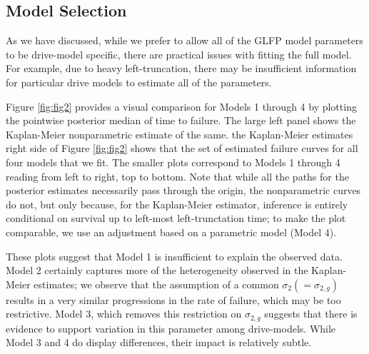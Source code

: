 \documentclass[12pt]{article}
\begin{document}



\subsection{Model Selection}
\label{sec:Model Comparisons}
As we have discussed, while we prefer to allow all of the GLFP model parameters to be drive-model specific, there are practical issues with fitting the full model. For example, due to heavy left-truncation, there may be insufficient information for particular drive models to estimate all of the parameters. 

Figure \ref{fig:fig2} provides a visual comparison for Models 1 through 4 by plotting the pointwise posterior median of time to failure. The large left panel shows the Kaplan-Meier nonparametric estimate of the same. the Kaplan-Meier estimates right side of Figure \ref{fig:fig2} shows that the set of estimated failure curves for all four models that we fit. The smaller plots correspond to Models 1 through 4 reading from left to right, top to bottom. Note that while all the paths for the posterior estimates necessarily pass through the origin, the nonparametric curves do not, but only because, for the Kaplan-Meier estimator, inference is entirely conditional on survival up to left-most left-trunctation time; to make the plot comparable, we use an adjustment based on a parametric model (Model 4).

These plots suggest that Model 1 is insufficient to explain the observed data. Model 2 certainly captures more of the heterogeneity observed in the Kaplan-Meier estimates; we observe that the assumption of a common $\sigma_2(=\sigma_{2,g})$ results in a very similar progressions in the rate of failure, which may be too restrictive. Model 3, which removes this restriction on $\sigma_{2,g}$ suggests that there is evidence to support variation in this parameter among drive-models. While Model 3 and 4 do display differences, their impact is relatively subtle.
\end{document}
